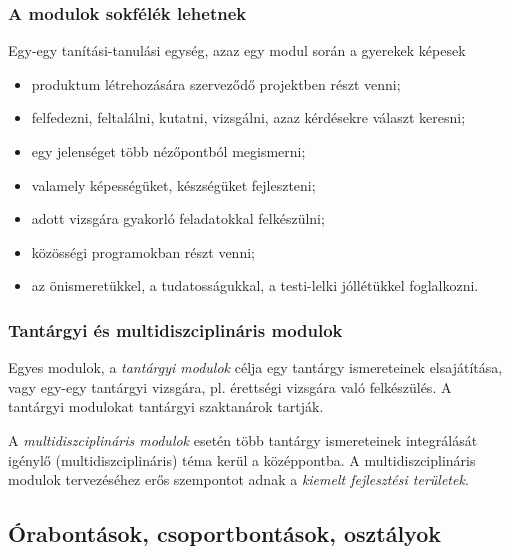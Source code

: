 \hypertarget{modulok-sokfelek-lehetnek}{%
\subsubsection{A modulok sokfélék
lehetnek}\label{modulok-sokfelek-lehetnek}}

Egy-egy tanítási-tanulási egység, azaz egy modul során a gyerekek
képesek

\begin{itemize}
\tightlist
\item
  produktum létrehozására szerveződő projektben részt venni;
\item
  felfedezni, feltalálni, kutatni, vizsgálni, azaz kérdésekre választ
  keresni;
\item
  egy jelenséget több nézőpontból megismerni;
\item
  valamely képességüket, készségüket fejleszteni;
\item
  adott vizsgára gyakorló feladatokkal felkészülni;
\item
  közösségi programokban részt venni;
\item
  az önismeretükkel, a tudatosságukkal, a testi-lelki jóllétükkel
  foglalkozni.
\end{itemize}

\hypertarget{tantargyi-es-multidiszciplinaris-modulok}{%
\subsubsection{Tantárgyi és multidiszciplináris
modulok}\label{tantargyi-es-multidiszciplinaris-modulok}}

Egyes modulok, a \emph{tantárgyi modulok} célja egy tantárgy
ismereteinek elsajátítása, vagy egy-egy tantárgyi vizsgára, pl.
érettségi vizsgára való felkészülés. A tantárgyi modulokat tantárgyi
szaktanárok tartják.

A \emph{multidiszciplináris modulok} esetén több tantárgy ismereteinek
integrálását igénylő (multidiszciplináris) téma kerül a középpontba. A
multidiszciplináris modulok tervezéséhez erős szempontot adnak a
{\emph{kiemelt
fejlesztési területek}}.

\hypertarget{orabontasok-csoportbontasok-osztalyok}{%
\subsection{Órabontások, csoportbontások,
osztályok}\label{orabontasok-csoportbontasok-osztalyok}}

